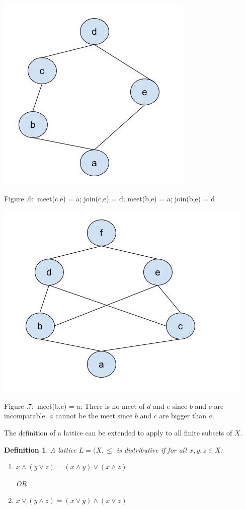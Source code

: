 \documentclass[twoside]{article}
\newcounter{lecnum}
\newcommand{\fig}[3]{
			\vspace{#2}
			\begin{center}
			Figure \thelecnum.#1:~#3
			\end{center}
	}
\newtheorem{definition}[theorem]{Definition}
\begin{document}
\begin{minipage}[]{\textwidth}
\centering
\includegraphics[width=.5\textwidth]{lattice2.jpg}
\end{minipage}
\fig{6}{0cm}{meet(c,e) = a; join(c,e) = d; meet(b,e) = a; join(b,e) = d}

\begin{minipage}[]{\textwidth}
\centering
\includegraphics[width=.5\textwidth]{lattice3.jpg}
\end{minipage}
\fig{7}{0cm}{meet(b,c) = a; There is no meet of $d$ and $e$ since $b$ and $c$ are incomparable. $a$ cannot be the meet since $b$ and $c$ are bigger than $a$.}

The definition of a lattice can be extended to apply to all finite subsets of $X$.

\begin{definition}
A lattice $L = (X, \leq$ is distributive if for all $x,y,z \in X$: 
\begin{enumerate}
    \item $x \wedge (y \vee z) = (x \wedge y) \vee (x \wedge z)$
    
    OR
    
    \item $x \vee (y \wedge z) = (x \vee y) \wedge (x \vee z)$
\end{enumerate}
\end{definition}
\vspace{.5cm}
\end{document}
